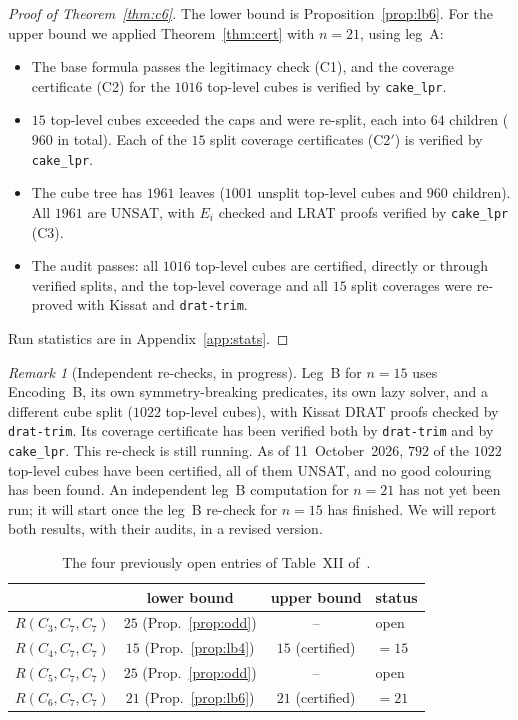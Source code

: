 \documentclass[11pt]{amsart}
\theoremstyle{definition}
\theoremstyle{remark}
\newtheorem{remark}[theorem]{Remark}
\begin{document}
\begin{proof}[Proof of Theorem~\ref{thm:c6}]
The lower bound is Proposition~\ref{prop:lb6}. For the upper bound we applied Theorem~\ref{thm:cert} with $n=21$, using leg~A:
\begin{itemize}
\item The base formula passes the legitimacy check (C1), and the coverage certificate (C2) for the $1016$ top-level cubes is verified by
\texttt{cake\_lpr}.
\item $15$ top-level cubes exceeded the caps and were re-split, each into $64$ children ($960$ in total). Each of the $15$ split
coverage certificates (C2$'$) is verified by \texttt{cake\_lpr}.
\item The cube tree has $1961$ leaves ($1001$ unsplit top-level cubes and $960$ children). All $1961$ are UNSAT, with $E_i$ checked
and LRAT proofs verified by \texttt{cake\_lpr} (C3).
\item The audit passes: all $1016$ top-level cubes are certified, directly or through verified splits, and the top-level coverage and all
$15$ split coverages were re-proved with Kissat and \texttt{drat-trim}.
\end{itemize}
Run statistics are in Appendix~\ref{app:stats}.
\end{proof}

\begin{remark}[Independent re-checks, in progress]\label{rem:legB}
Leg~B for $n=15$ uses Encoding~B, its own symmetry-breaking predicates, its own lazy solver, and a different cube split
($1022$ top-level cubes), with Kissat DRAT proofs checked by \texttt{drat-trim}. Its coverage certificate has been verified both by
\texttt{drat-trim} and by \texttt{cake\_lpr}. This re-check is still running. As of 11~October~2026, $792$ of the $1022$ top-level
cubes have been certified, all of them UNSAT, and no good colouring has been found. An independent leg~B computation for $n=21$ has not
yet been run; it will start once the leg~B re-check for $n=15$ has finished. We will report both results, with their audits, in a
revised version.
\end{remark}

\begin{table}[ht]
\caption{The four previously open entries of Table~XII of~\cite{Rad}.}\label{tab:results}
\begin{tabular}{lccl}
\toprule
 & lower bound & upper bound & status \\
\midrule
$R(C_3,C_7,C_7)$ & $25$ (Prop.~\ref{prop:odd}) & -- & open \\
$R(C_4,C_7,C_7)$ & $15$ (Prop.~\ref{prop:lb4}) & $15$ (certified) & $=15$ \\
$R(C_5,C_7,C_7)$ & $25$ (Prop.~\ref{prop:odd}) & -- & open \\
$R(C_6,C_7,C_7)$ & $21$ (Prop.~\ref{prop:lb6}) & $21$ (certified) & $=21$ \\
\bottomrule
\end{tabular}
\end{table}
\end{document}

